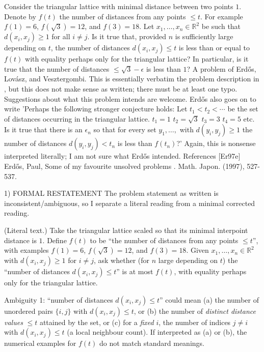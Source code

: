 Consider the triangular lattice with minimal distance between two points $1$. Denote by $f(t)$ the number of distances from any points $\leq t$. For example $f(1)=6$, $f(\sqrt{3})=12$, and $f(3)=18$. Let $x_1,\ldots,x_n\in \mathbb{R}^2$ be such that $d(x_i,x_j)\geq 1$ for all $i\neq j$. Is it true that, provided $n$ is sufficiently large depending on $t$, the number of distances $d(x_i,x_j)\leq t$ is less than or equal to $f(t)$ with equality perhaps only for the triangular lattice? In particular, is it true that the number of distances $\leq \sqrt{3}-\epsilon$ is less than $1$? A problem of Erd\H{o}s, Lov\'{a}sz, and Vesztergombi. This is essentially verbatim the problem description in \cite{Er97e}, but this does not make sense as written; there must be at least one typo. Suggestions about what this problem intends are welcome. Erd\H{o}s also goes on to write 'Perhaps the following stronger conjecture holds: Let $t_1<t_2<\cdots$ be the set of distances occurring in the triangular lattice. $t_1=1$ $t_2=\sqrt{3}$ $t_3=3$ $t_4=5$ etc. Is it true that there is an $\epsilon_n$ so that for every set $y_1,\ldots,$ with $d(y_i,y_j)\geq 1$ the number of distances $d(y_i,y_j)<t_n$ is less than $f(t_n)$?' Again, this is nonsense interpreted literally; I am not sure what Erd\H{o}s intended. References [Er97e] Erd\H{o}s, Paul, Some of my favourite unsolved problems . Math. Japon. (1997), 527-537.


1) FORMAL RESTATEMENT
The problem statement as written is inconsistent/ambiguous, so I separate a literal reading from a minimal corrected reading.

(Literal text.)
Take the triangular lattice scaled so that its minimal interpoint distance is $1$. Define $f(t)$ to be
``the number of distances from any points $\le t$'', with examples $f(1)=6$, $f(\sqrt3)=12$, and $f(3)=18$.
Given $x_1,\ldots,x_n\in\mathbb{R}^2$ with $d(x_i,x_j)\ge 1$ for $i\neq j$, ask whether (for $n$ large depending on $t$) the
``number of distances $d(x_i,x_j)\le t$'' is at most $f(t)$, with equality perhaps only for the triangular lattice.

Ambiguity 1: ``number of distances $d(x_i,x_j)\le t$'' could mean
(a) the number of unordered pairs $\{i,j\}$ with $d(x_i,x_j)\le t$, or
(b) the number of \emph{distinct distance values} $\le t$ attained by the set, or
(c) for a \emph{fixed} $i$, the number of indices $j\neq i$ with $d(x_i,x_j)\le t$ (a local neighbour count).
If interpreted as (a) or (b), the numerical examples for $f(t)$ do not match standard meanings.


